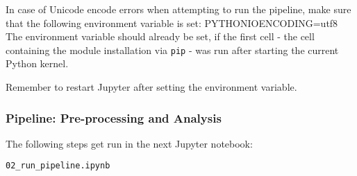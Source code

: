\documentclass[11pt]{article}
\begin{document}
    In case of Unicode encode errors when attempting to run the pipeline,
make sure that the following environment variable is set:
PYTHONIOENCODING=utf8
    The environment variable should already be set, if the first cell - the
cell containing the module installation via \texttt{pip} - was run after
starting the current Python kernel.

Remember to restart Jupyter after setting the environment variable.

    \subsubsection{Pipeline: Pre-processing and
Analysis}\label{pipeline-pre-processing-and-analysis}

The following steps get run in the next Jupyter notebook:

\begin{verbatim}
02_run_pipeline.ipynb
\end{verbatim}


    
    
    
\end{document}
